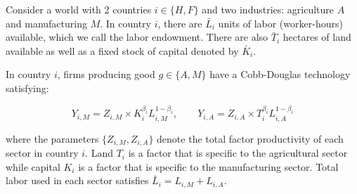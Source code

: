 \documentclass[11pt,letterpaper]{exam}
\newcommand{\red}[1]{\textcolor{red}{#1}}
\begin{document}
\begin{questions}
\begin{parts}
\end{parts}

\question[45] Consider a world with 2 countries $i \in \{ H, F\}$ and two industries: agriculture $A$ and manufacturing $M$. In country $i$, there are $\bar{L}_i$ units of labor (worker-hours) available, which we call the labor endowment. There are also $\bar{T}_i$ hectares of land available as well as a fixed stock of capital denoted by $\bar{K}_i$.

In country $i$, firms producing good $g \in \{ A,M\}$ have a Cobb-Douglas technology satisfying:

\begin{equation*}
 Y_{i,M} = Z_{i,M} \times K_{i}^{\beta_i} L_{i,M}^{1-\beta_i}, \qquad  Y_{i,A} = Z_{i,A} \times T_{i}^{\beta_i} L_{i,A}^{1-\beta_i}
\end{equation*}

\noindent where the parameters $\{ Z_{i,M}, Z_{i,A}\}$ denote the total factor productivity of each sector in country $i$. Land $T_i$ is a factor that is specific to the agricultural sector while capital $K_i$ is a factor that is specific to the manufacturing sector. Total labor used in each sector satisfies $\bar{L}_i = L_{i,M} + L_{i,A}$.

\end{questions}
\end{document}
